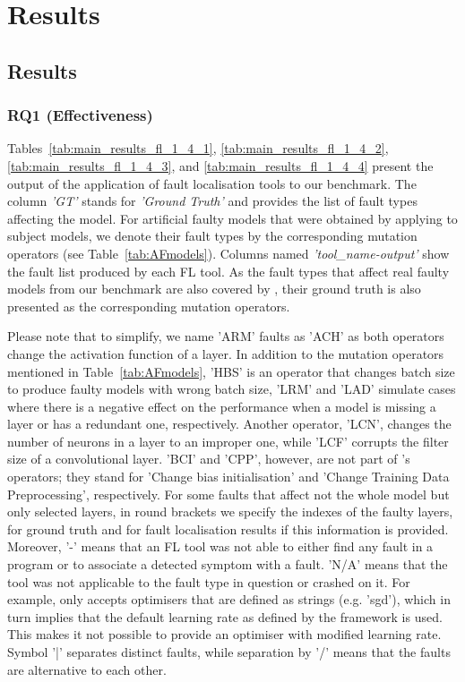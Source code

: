 
\section{Results}
\label{sec:results}
\subsection{Results}
\subsubsection{RQ1 (Effectiveness)}


Tables~\ref{tab:main_results_fl_1_4_1}, \ref{tab:main_results_fl_1_4_2}, \ref{tab:main_results_fl_1_4_3}, and \ref{tab:main_results_fl_1_4_4} present the output of the application of fault localisation tools to our benchmark. The column \textit{'GT'} stands for \textit{'Ground Truth'} and provides the list of fault types affecting the model. For artificial faulty models that were obtained by applying \DC to subject models, we denote their fault types by the corresponding mutation operators (see Table~\ref{tab:AFmodels}). Columns named \textit{'tool\_name-output'} show the fault list produced by each FL tool. As the fault types that affect real faulty models from our benchmark are also covered by \DC, their ground truth is also presented as the corresponding mutation operators.

Please note that to simplify, we name 'ARM' faults as 'ACH' as both operators change the activation function of a layer. In addition to the mutation operators mentioned in Table~\ref{tab:AFmodels}, 'HBS' is an operator that changes batch size to produce faulty models with wrong batch size, 'LRM' and 'LAD' simulate cases where there is a negative effect on the performance when a model is missing a layer or has a redundant one, respectively. Another operator, 'LCN', changes the number of neurons in a layer to an improper one, while 'LCF' corrupts the filter size of a convolutional layer. 'BCI' and 'CPP', however, are not part of \DC's operators; they stand for 'Change bias initialisation' and 'Change Training Data Preprocessing', respectively. For some faults that affect not the whole model but only selected layers, in round brackets we specify the indexes of the faulty layers, for ground truth and for fault localisation results if this information is provided. Moreover, '-' means that an FL tool was not able to either find any fault in a program or to associate a detected symptom with a fault. 'N/A' means that the tool was not applicable to the fault type in question or crashed on it. For example, \NL only accepts optimisers that are defined as strings (e.g. 'sgd'), which in turn implies that the default learning rate as defined by the framework is used. This makes it not possible to provide an optimiser with modified learning rate. Symbol '|' separates distinct faults, while separation by '/' means that the faults are alternative to each other. 

